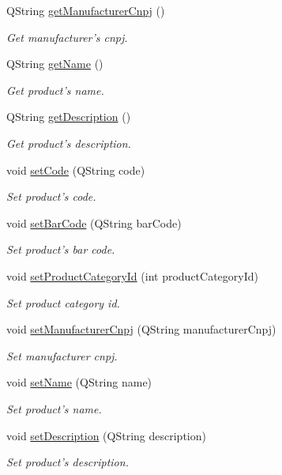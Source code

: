 \begin{DoxyCompactItemize}
\-Q\-String \hyperlink{class_product_ae88494f6e22f68b7408ceff33947afb7}{get\-Manufacturer\-Cnpj} ()
\begin{DoxyCompactList}\small\item\em \-Get manufacturer's cnpj. \end{DoxyCompactList}\item 
\-Q\-String \hyperlink{class_product_a1b246edde54b5bf86582dc36e734f6e1}{get\-Name} ()
\begin{DoxyCompactList}\small\item\em \-Get product's name. \end{DoxyCompactList}\item 
\-Q\-String \hyperlink{class_product_a3ef70173eee72910c24dd058776ffd28}{get\-Description} ()
\begin{DoxyCompactList}\small\item\em \-Get product's description. \end{DoxyCompactList}\item 
void \hyperlink{class_product_a6f5d10f145759ba9bd66effdbe4d4872}{set\-Code} (\-Q\-String code)
\begin{DoxyCompactList}\small\item\em \-Set product's code. \end{DoxyCompactList}\item 
void \hyperlink{class_product_af7edbd8502dacbfccdaf10485c9b7358}{set\-Bar\-Code} (\-Q\-String bar\-Code)
\begin{DoxyCompactList}\small\item\em \-Set product's bar code. \end{DoxyCompactList}\item 
void \hyperlink{class_product_a7a6c3074ed7aa65edb55c1635cea2b8c}{set\-Product\-Category\-Id} (int product\-Category\-Id)
\begin{DoxyCompactList}\small\item\em \-Set product category id. \end{DoxyCompactList}\item 
void \hyperlink{class_product_ac28efc683064b82e2c232aa19a16dcc3}{set\-Manufacturer\-Cnpj} (\-Q\-String manufacturer\-Cnpj)
\begin{DoxyCompactList}\small\item\em \-Set manufacturer cnpj. \end{DoxyCompactList}\item 
void \hyperlink{class_product_af48b9dc31b1b6ee65f3f9d2d2333f999}{set\-Name} (\-Q\-String name)
\begin{DoxyCompactList}\small\item\em \-Set product's name. \end{DoxyCompactList}\item 
void \hyperlink{class_product_a2fd4c0e30145c178f06f76befee86d82}{set\-Description} (\-Q\-String description)
\begin{DoxyCompactList}\small\item\em \-Set product's description. \end{DoxyCompactList}\end{DoxyCompactItemize}


